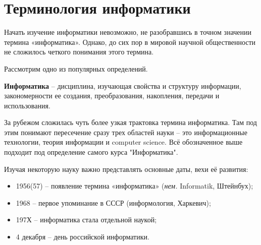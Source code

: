 \section{Терминология информатики}

Начать изучение информатики невозможно, не разобравшись в точном значении термина «информатика». Однако, до сих пор в мировой научной общественности не сложилось четкого понимания этого термина. 
\par Рассмотрим одно из популярных определений.

\textbf{Информатика} – дисциплина, изучающая свойства и структуру информации, закономерности ее создания, преобразования, накопления, передачи и использования. \par За рубежом сложилась чуть более узкая трактовка термина информатика. Там под этим понимают пересечение сразу трех областей науки – это информационные технологии, теория информации и computer science. Всё обозначенное выше подходит под определение самого курса "Информатика".

Изучая некоторую науку важно представлять основные даты, вехи её развития:
\begin{itemize}
\item 1956(57) – появление термина «информатика» (\textit{нем.} Informatik, Штейнбух);
\item 1968 -- первое упоминание в СССР (информология, Харкевич);
\item 197Х -- информатика стала отдельной наукой;
\item 4 декабря -- день российской информатики.
\end{itemize}
